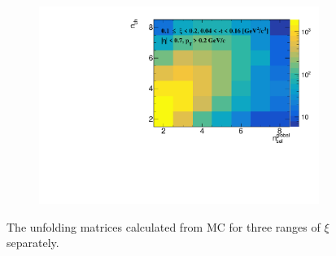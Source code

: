 \begin{figure}[h!]
\begin{subfigure}{.49\textwidth}
		\includegraphics[width=\textwidth,page=1]{chapters/chrgSTAR/img/unfolding/matrix_2.pdf}
	\end{subfigure}
	\begin{minipage}{.49\textwidth}
		\caption{The unfolding matrices calculated  from MC for three ranges of $\xi$ separately.}
		\label{fig:responseSTAR}
	\end{minipage}
\end{figure}
\captionsetup{format=default,indention=0pt,justification=justified}


\FloatBarrier